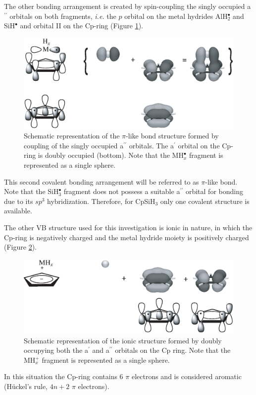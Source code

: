 The other bonding arrangement is created by spin-coupling the singly occupied a$^{\prime\prime}$ orbitals on both fragments, \textit{i.e.} the $p$ orbital on the metal hydrides AlH$_{2}^\bullet$ and SiH$^\bullet$ and orbital II on the Cp-ring (Figure \ref{ch4.fig.pi}).
\begin{figure}[htbp]
\center
\includegraphics[scale=0.45]{cyclopentadienyl/figures/pi.eps}
\caption{Schematic representation of the $\pi$-like bond structure formed by coupling of the singly occupied a$^{\prime\prime}$ orbitals. The a$^\prime$ orbital on the Cp-ring is doubly occupied (bottom). Note that the MH$_{x}^{\bullet}$ fragment is represented as a single sphere.}
\label{ch4.fig.pi}
\end{figure}
This second covalent bonding arrangement will be referred to as $\pi$-like bond. Note that the SiH$_{3}^\bullet$ fragment does not possess a suitable a$^{\prime\prime}$ orbital for bonding due to its $sp^3$ hybridization. Therefore, for CpSiH$_3$ only one covalent structure is available.

The other VB structure used for this investigation is ionic in nature, in which the Cp-ring is negatively charged and the metal hydride moiety is positively charged (Figure \ref{ch4.fig.ionic}).
\begin{figure}[htbp]
\center
\includegraphics[scale=0.45]{cyclopentadienyl/figures/ionic.eps}
\caption{Schematic representation of the ionic structure formed by doubly occupying both the a$^{\prime}$ and a$^{\prime\prime}$ orbitals on the Cp ring. Note that the MH$_{x}^{+}$ fragment is represented as a single sphere.}
\label{ch4.fig.ionic}
\end{figure}
In this situation the Cp-ring contains 6 $\pi$ electrons and is considered aromatic (H\"{u}ckel's rule, $4n+2$ $\pi$ electrons). 


